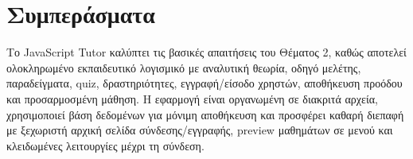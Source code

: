 \documentclass[12pt,a4paper]{article}
\newcommand{\textlatin}[1]{\textenglish{#1}}
\begin{document}
\section{Συμπεράσματα}

Το \textlatin{JavaScript Tutor} καλύπτει τις βασικές απαιτήσεις του Θέματος 2, καθώς αποτελεί ολοκληρωμένο εκπαιδευτικό λογισμικό με αναλυτική θεωρία, οδηγό μελέτης, παραδείγματα, quiz, δραστηριότητες, εγγραφή/είσοδο χρηστών, αποθήκευση προόδου και προσαρμοσμένη μάθηση. Η εφαρμογή είναι οργανωμένη σε διακριτά αρχεία, χρησιμοποιεί βάση δεδομένων για μόνιμη αποθήκευση και προσφέρει καθαρή διεπαφή με ξεχωριστή αρχική σελίδα σύνδεσης/εγγραφής, preview μαθημάτων σε μενού και κλειδωμένες λειτουργίες μέχρι τη σύνδεση.
\end{document}
